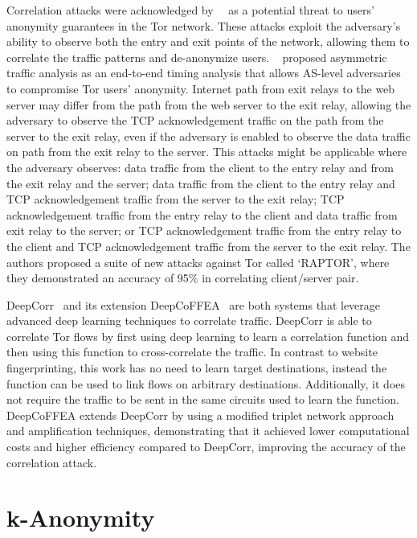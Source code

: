 Correlation attacks were acknowledged by~\citeauthor{dingledine2004tor}~\cite{dingledine2004tor} as a potential threat to users' anonymity guarantees in the Tor network. These attacks exploit the adversary's ability to observe both the entry and exit points of the network, allowing them to correlate the traffic patterns and de-anonymize users.
\citeauthor{RAPTOR}~\cite{RAPTOR} proposed asymmetric traffic analysis as an end-to-end timing analysis that allows AS-level adversaries to compromise Tor users' anonymity. Internet path from exit relays to the web server may differ from the path from the web server to the exit relay, allowing the adversary to observe the TCP acknowledgement traffic on the path from the server to the exit relay, even if the adversary is enabled to observe the data traffic on path from the exit relay to the server. This attacks might be applicable where the adversary observes: data traffic from the client to the entry relay and from the exit relay and the server; data traffic from the client to the entry relay and TCP acknowledgement traffic from the server to the exit relay; TCP acknowledgement traffic from the entry relay to the client and data traffic from exit relay to the server; or TCP acknowledgement traffic from the entry relay to the client and TCP acknowledgement traffic from the server to the exit relay. The authors proposed a suite of new attacks against Tor called `RAPTOR', where they demonstrated an accuracy of 95\% in correlating client/server pair. 

DeepCorr~\cite{DeepCorr} and its extension DeepCoFFEA~\cite{DeepCoFFEA} are both systems that leverage advanced deep learning techniques to correlate traffic. DeepCorr is able to correlate Tor flows by first using deep learning to learn a correlation function and then using this function to cross-correlate the traffic. In contrast to website fingerprinting, this work has no need to learn target destinations, instead the function can be used to link flows on arbitrary destinations. Additionally, it does not require the traffic to be sent in the same circuits used to learn the function. DeepCoFFEA extends DeepCorr by using a modified triplet network approach and amplification techniques, demonstrating that it achieved lower computational costs and higher efficiency compared to DeepCorr, improving the accuracy of the correlation attack.


\section{k-Anonymity}\label{sec:k_anonymity}

